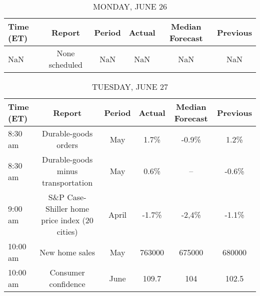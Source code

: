 \documentclass{article}%
\begin{document}
%
\normalsize%


\begin{table}[htbp]%
\caption{MONDAY, JUNE 26}%
\centering%
\begin{adjustbox}{width=1\textwidth}%
\begin{tabular}{lccccc}
\toprule
Time (ET) &         Report & Period & Actual & Median Forecast & Previous \\
\midrule
      NaN & None scheduled &    NaN &    NaN &             NaN &      NaN \\
\bottomrule
\end{tabular}
%
\end{adjustbox}%
\end{table}

%


\begin{table}[htbp]%
\caption{TUESDAY, JUNE 27}%
\centering%
\begin{adjustbox}{width=1\textwidth}%
\begin{tabular}{lccccc}
\toprule
Time (ET) &                                        Report & Period & Actual & Median Forecast & Previous \\
\midrule
  8:30 am &                          Durable-goods orders &    May &   1.7\% &           -0.9\% &     1.2\% \\
  8:30 am &            Durable-goods minus transportation &    May &   0.6\% &              -- &    -0.6\% \\
  9:00 am & S\&P Case-Shiller home price index (20 cities) &  April &  -1.7\% &           -2,4\% &    -1.1\% \\
 10:00 am &                                New home sales &    May & 763000 &          675000 &   680000 \\
 10:00 am &                           Consumer confidence &   June &  109.7 &             104 &    102.5 \\
\bottomrule
\end{tabular}
%
\end{adjustbox}%
\end{table}

%
\end{document}
